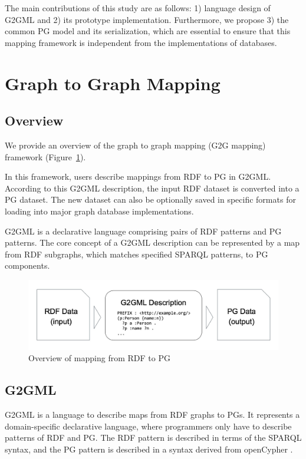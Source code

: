 \documentclass[runningheads]{llncs}
\begin{document}
The main contributions of this study are as follows: 1) language design of G2GML and 2) its prototype implementation. Furthermore, we propose 3) the common PG model and its serialization, which are essential to ensure that this mapping framework is independent from the implementations of databases.


\section{Graph to Graph Mapping}

\subsection{Overview}

We provide an overview of the graph to graph mapping (G2G mapping) framework (Figure~\ref{fig:dataflow}).

In this framework, users describe mappings from RDF to PG in G2GML.
According to this G2GML description, the input RDF dataset is converted into a PG dataset. The new dataset can also be optionally saved in specific formats for loading into major graph database implementations.

G2GML is a declarative language comprising pairs of RDF patterns and PG patterns. 
The core concept of a G2GML description can be represented by a map from RDF subgraphs, which matches specified SPARQL patterns, to PG components.

 
\begin{figure}
\center
\includegraphics[width=1.0\textwidth]{dataflow.jpg}
\caption{Overview of mapping from RDF to PG}
\label{fig:dataflow}
\end{figure}


\subsection{G2GML}

G2GML is a language to describe maps from RDF graphs to PGs. It represents a domain-specific declarative language, where programmers only have to describe patterns of RDF and PG. The RDF pattern is described in terms of the SPARQL syntax, and the PG pattern is described in a syntax derived from openCypher \cite{openCypher}.
\end{document}
